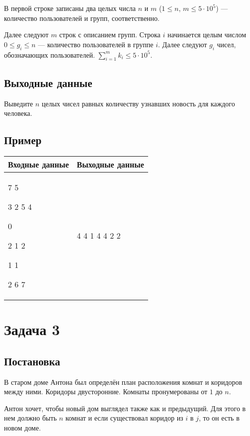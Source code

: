 \documentclass{extarticle}
\begin{document}
В первой строке записаны два целых числа \(n\) и \(m\)
(\(1 \leq n\), \(m \leq 5 \cdot 10^{5}\)) — количество пользователей и групп, соответственно.

Далее следуют \(m\) строк с описанием групп.
Строка \(i\) начинается целым числом \(0 \leq g_{i} \leq n\) — количество пользователей в
группе \(i\).
Далее следуют \(g_{i}\) чисел, обозначающих пользователей.
\(\sum_{i=1}^{m} k_{i} \leq 5 \cdot 10^{5}\).

\subsection*{Выходные данные}
\label{sec:orgf9da829}

Выведите \(n\) целых чисел
равных количеству узнавших новость для каждого человека.

\subsection*{Пример}
\label{sec:orgd7d348d}

\begin{table}[H]
\begin{center}
\begin{tabular}{|m{4cm}|m{4cm}|}
\hline
Входные данные & Выходные данные \\ \hline
7 5

3 2 5 4

0

2 1 2

1 1

2 6 7
&
4 4 1 4 4 2 2
\\ \hline
\end{tabular}
\end{center}
\end{table}

\pagebreak
\section*{Задача 3}
\label{sec:org570b899}
\subsection*{Постановка}
\label{sec:orga2b5149}

В старом доме Антона был определён план
расположения комнат и коридоров между ними.
Коридоры двусторонние.
Комнаты пронумерованы от \(1\) до \(n\).

Антон хочет, чтобы новый дом выглядел также как и предыдущий.
Для этого в нем должно быть \(n\) комнат и если существовал
коридор из \(i\) в \(j\), то он есть в новом доме.
\end{document}
